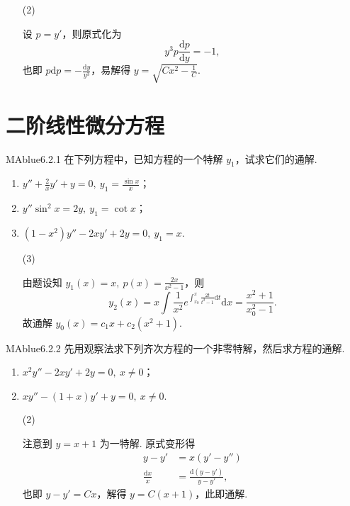 \begin{enumerate}
    \item[(2)]
    \begin{solution}
        设 $p = y'$，则原式化为
        \[
            y^3 p \frac{\mathrm dp}{\mathrm dy} = -1,
        \]
        也即 $p \mathrm dp = - \frac{\mathrm dy}{y^3}$，易解得 $y = \sqrt{Cx^2 - \frac 1 C}$.
    \end{solution}
\end{enumerate}

\section{二阶线性微分方程}

\begin{problem}{MAblue}{6.2.1}
    在下列方程中，已知方程的一个特解 $y_1$，试求它们的通解.
    \begin{enumerate}[label={(\arabic*)}]
        \item $y'' + \frac 2 x y' + y = 0,\ y_1 = \frac {\sin x} x$；
        \item $y'' \sin^2x = 2y,\ y_1 = \cot x$；
        \item $(1-x^2)y'' - 2xy' + 2y = 0,\ y_1 = x$.
    \end{enumerate}
\end{problem}

\begin{enumerate}
    \item[(3)]
    \begin{solution}
        由题设知 $y_1(x) = x,\ p(x) = \frac{2x}{x^2 - 1}$，则
        \[
            y_2(x) = x \int \frac 1 {x^2} e^{\int_{x_0}^x \frac{2t}{t^2 - 1} \mathrm dt} \mathrm dx = \frac{x^2 + 1}{x_0^2 - 1}.
        \]
        故通解 $y_0(x) = c_1x + c_2 (x^2 + 1)$.
    \end{solution}
\end{enumerate}

\begin{problem}{MAblue}{6.2.2}
    先用观察法求下列齐次方程的一个非零特解，然后求方程的通解.
    \begin{enumerate}[label={(\arabic*)}]
        \item $x^2y'' - 2xy' + 2y = 0,\ x \neq 0$；
        \item $xy'' - (1+x)y' + y = 0,\ x \neq 0$.
    \end{enumerate}
\end{problem}

\begin{enumerate}
    \item[(2)]
    \begin{solution}
        注意到 $y = x + 1$ 为一特解. 原式变形得
        \begin{align*}
            y - y' &= x(y' - y'') \\
            \frac {\mathrm dx} x &= \frac{\mathrm d(y-y')}{y-y'},
        \end{align*}
        也即 $y - y' = Cx$，解得 $y = C(x+1)$，此即通解.
    \end{solution}
\end{enumerate}

